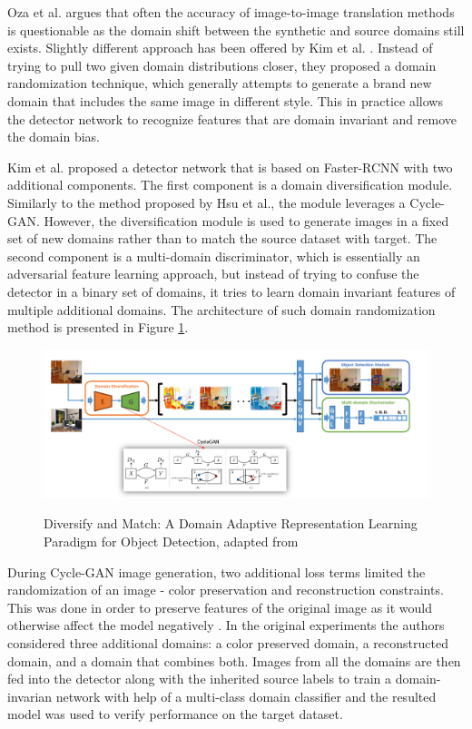 \documentclass[english, 12pt, a4paper, elec, utf8, a-1b, online]{aaltothesis}
\begin{document}
Oza et al. \cite{Oza2021} argues that often the accuracy of image-to-image translation methods is questionable as the domain shift between the synthetic and source domains still exists. Slightly different approach has been offered by Kim et al. \cite{Kim2019}. Instead of trying to pull two given domain distributions closer, they proposed a domain randomization technique, which generally attempts to generate a brand new domain that includes the same image in different style. This in practice allows the detector network to recognize features that are domain invariant and remove the domain bias. 

Kim et al. proposed a detector network that is based on Faster-RCNN with two additional components. The first component is a domain diversification module. Similarly to the method proposed by Hsu et al.\cite{Hsu2019}, the module leverages a Cycle-GAN\cite{Zhu2017}. However, the diversification module is used to generate images in a fixed set of new domains rather than to match the source dataset with target.  The second component is a multi-domain discriminator, which is essentially an adversarial feature learning approach, but instead of trying to confuse the detector in a binary set of domains, it tries to learn domain invariant features of multiple additional domains. The architecture of such domain randomization method is presented in Figure \ref{diversify}.

\begin{figure}[htb]
	\begin{center}
		\includegraphics[width=16cm]{./diversify.png}
	\end{center}
	\caption{Diversify and Match: A Domain Adaptive Representation Learning Paradigm for Object Detection, adapted from \cite{Kim2019}}
	\begin{center}
		\label{diversify}
	\end{center}
\end{figure}
\FloatBarrier

During Cycle-GAN image generation, two additional loss terms limited the  randomization of an image - color preservation and reconstruction constraints. This was done in order to preserve features of the original image as it would otherwise affect the model negatively \cite{Oza2021}. In the original experiments the authors considered three additional domains: a color preserved domain, a reconstructed domain, and a domain that combines both. Images from all the domains are then fed into the detector along with the inherited source labels   to train a domain-invarian network with help of a multi-class domain classifier and the resulted model was used to verify performance on the target dataset. 
\end{document}
